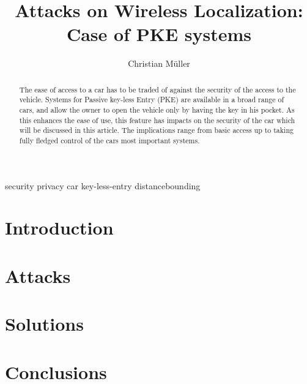 \documentclass[draftcls,a4paper]{IEEEtran}
\title{Attacks on Wireless Localization:\\Case of PKE systems}
\author{Christian Müller}
\begin{document}
\maketitle
\begin{IEEEkeywords}
security privacy car key-less-entry distancebounding
\end{IEEEkeywords}


\begin{abstract}
The ease of access to a car has to be traded of against the security of the
access to the vehicle.
Systems for Passive key-less Entry (PKE) are available in a broad range of cars,
and allow the owner to open the vehicle only by having the key in his pocket.
As this enhances the ease of use, this feature has impacts on the security of
the car which will be discussed in this article. The implications range from 
basic access up to taking fully fledged control of the cars most important
systems.
\end{abstract}

\section{Introduction}
	

\section{Attacks}
	

\section{Solutions}
	


\section{Conclusions}
	

\newpage
\nocite{*}


\end{document}
